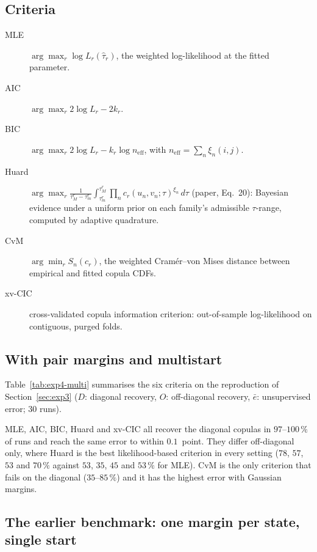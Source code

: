 \documentclass[11pt,a4paper]{article}
\begin{document}
\subsection{Criteria}

\begin{description}
  \item[MLE] $\arg\max_r \log L_r(\hat\tau_r)$, the weighted log-likelihood
    at the fitted parameter.
  \item[AIC] $\arg\max_r 2\log L_r - 2k_r$.
  \item[BIC] $\arg\max_r 2\log L_r - k_r\log n_{\text{eff}}$, with
    $n_{\text{eff}}=\sum_n\xi_n(i,j)$.
  \item[Huard] $\arg\max_r \frac{1}{\tau_M^r-\tau_m^r}
    \int_{\tau_m^r}^{\tau_M^r}\!\prod_n c_r(u_n,v_n;\tau)^{\xi_n}\,d\tau$
    (paper, Eq.~20): Bayesian evidence under a uniform prior on each
    family's admissible $\tau$-range, computed by adaptive quadrature.
  \item[CvM] $\arg\min_r S_n(c_r)$, the weighted Cram\'er--von Mises distance
    between empirical and fitted copula CDFs.
  \item[xv-CIC] cross-validated copula information criterion: out-of-sample
    log-likelihood on contiguous, purged folds.
\end{description}

\subsection{With pair margins and multistart}

Table~\ref{tab:exp4-multi} summarises the six criteria on the reproduction of
Section~\ref{sec:exp3} ($D$: diagonal recovery, $O$: off-diagonal recovery,
$\bar e$: unsupervised error; 30 runs).

{\setlength{\tabcolsep}{2.2pt}}

MLE, AIC, BIC, Huard and xv-CIC all recover the diagonal copulas in
$97$--$100\,\%$ of runs and reach the same error to within $0.1$~point. They
differ off-diagonal only, where Huard is the best likelihood-based criterion
in every setting ($78$, $57$, $53$ and $70\,\%$ against $53$, $35$, $45$ and
$53\,\%$ for MLE). CvM is the only criterion that fails on the diagonal
($35$--$85\,\%$) and it has the highest error with Gaussian margins.

\subsection{The earlier benchmark: one margin per state, single start}
\end{document}
